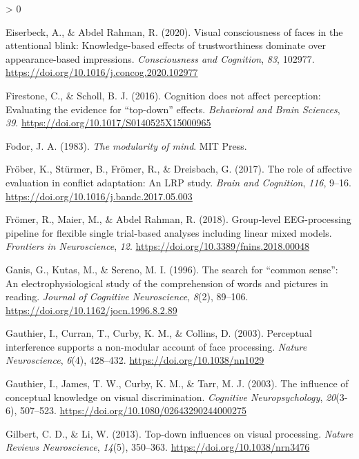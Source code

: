 \documentclass[
  english,
  man,floatsintext]{apa7}
\newlength{\cslhangindent}
\newenvironment{CSLReferences}[2] %
 {%
  \setlength{\parindent}{0pt}
  \ifodd #1 \everypar{\setlength{\hangindent}{\cslhangindent}}\ignorespaces\fi
  \ifnum #2 > 0
  \setlength{\parskip}{#2\baselineskip}
  \fi
 }%
 {}
\begin{document}
\begin{CSLReferences}{1}{0}
\leavevmode\hypertarget{ref-eiserbeck2020}{}%
Eiserbeck, A., \& Abdel Rahman, R. (2020). Visual consciousness of faces in the attentional blink: Knowledge-based effects of trustworthiness dominate over appearance-based impressions. \emph{Consciousness and Cognition}, \emph{83}, 102977. \url{https://doi.org/10.1016/j.concog.2020.102977}

\leavevmode\hypertarget{ref-firestone2016}{}%
Firestone, C., \& Scholl, B. J. (2016). Cognition does not affect perception: Evaluating the evidence for {``top-down''} effects. \emph{Behavioral and Brain Sciences}, \emph{39}. \url{https://doi.org/10.1017/S0140525X15000965}

\leavevmode\hypertarget{ref-fodor1983}{}%
Fodor, J. A. (1983). \emph{The modularity of mind}. MIT Press.

\leavevmode\hypertarget{ref-fruxf6ber2017}{}%
Fröber, K., Stürmer, B., Frömer, R., \& Dreisbach, G. (2017). The role of affective evaluation in conflict adaptation: An {LRP} study. \emph{Brain and Cognition}, \emph{116}, 9--16. \url{https://doi.org/10.1016/j.bandc.2017.05.003}

\leavevmode\hypertarget{ref-fruxf6mer2018}{}%
Frömer, R., Maier, M., \& Abdel Rahman, R. (2018). Group-level {EEG}-processing pipeline for flexible single trial-based analyses including linear mixed models. \emph{Frontiers in Neuroscience}, \emph{12}. \url{https://doi.org/10.3389/fnins.2018.00048}

\leavevmode\hypertarget{ref-ganis1996}{}%
Ganis, G., Kutas, M., \& Sereno, M. I. (1996). The search for {``common sense''}: An electrophysiological study of the comprehension of words and pictures in reading. \emph{Journal of Cognitive Neuroscience}, \emph{8}(2), 89--106. \url{https://doi.org/10.1162/jocn.1996.8.2.89}

\leavevmode\hypertarget{ref-gauthier2003a}{}%
Gauthier, I., Curran, T., Curby, K. M., \& Collins, D. (2003). Perceptual interference supports a non-modular account of face processing. \emph{Nature Neuroscience}, \emph{6}(4), 428--432. \url{https://doi.org/10.1038/nn1029}

\leavevmode\hypertarget{ref-gauthier2003}{}%
Gauthier, I., James, T. W., Curby, K. M., \& Tarr, M. J. (2003). The influence of conceptual knowledge on visual discrimination. \emph{Cognitive Neuropsychology}, \emph{20}(3-6), 507--523. \url{https://doi.org/10.1080/02643290244000275}

\leavevmode\hypertarget{ref-gilbert2013}{}%
Gilbert, C. D., \& Li, W. (2013). Top-down influences on visual processing. \emph{Nature Reviews Neuroscience}, \emph{14}(5), 350--363. \url{https://doi.org/10.1038/nrn3476}


\end{CSLReferences}
\end{document}
